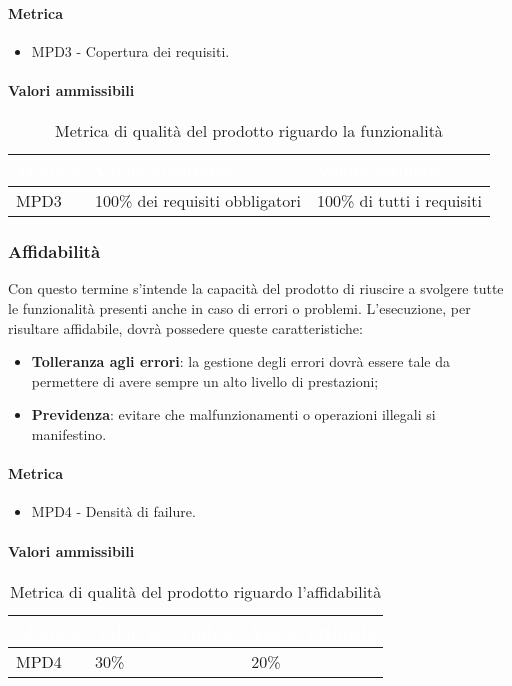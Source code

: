 \paragraph{Metrica}
\begin{itemize}
\item MPD3 - Copertura dei requisiti.
\end{itemize}
\paragraph{Valori ammissibili}
\renewcommand{\arraystretch}{1.5}
\begin{longtable}{C{2.5cm} C{4cm} C{4cm}}
\textcolor{white}{\textbf{Metrica}}&
\textcolor{white}{\textbf{Valore accettabile}}&
\textcolor{white}{\textbf{Valore ottimale}}\\	
\endhead
\endfoot
{}\caption{Metrica di qualità del prodotto riguardo la funzionalità}
\endlastfoot
		MPD3 & 
		100\% dei requisiti obbligatori &
		100\% di tutti i requisiti \\
\end{longtable}
\subsubsection{Affidabilità}
Con questo termine s'intende la capacità del prodotto di riuscire a svolgere tutte le funzionalità presenti anche in caso di errori o problemi. L'esecuzione, per risultare affidabile, dovrà possedere queste caratteristiche:
\begin{itemize}
\item \textbf{Tolleranza agli errori}: la gestione degli errori dovrà essere tale da permettere di avere sempre un alto livello di prestazioni;
\item \textbf{Previdenza}: evitare che malfunzionamenti o operazioni illegali si manifestino.
\end{itemize}
\paragraph{Metrica}
\begin{itemize}
\item MPD4 - Densità di failure.
\end{itemize}
\paragraph{Valori ammissibili}
\renewcommand{\arraystretch}{1.5}
\begin{longtable}{C{2.5cm} C{4cm} C{4cm}}
\textcolor{white}{\textbf{Metrica}}&
\textcolor{white}{\textbf{Valori accettabile}}&
\textcolor{white}{\textbf{Valore ottimale}}\\	
\endhead
\endfoot
{}\caption{Metrica di qualità del prodotto riguardo l'affidabilità}
\endlastfoot
		MPD4 &  
		30\% &
		20\% \\
\end{longtable}
